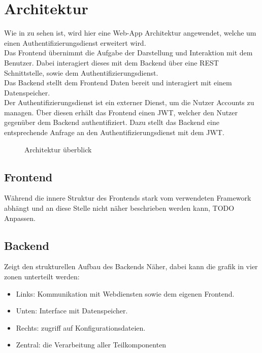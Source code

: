 \chapter{Architektur}\label{ch:architektur}

Wie in  zu sehen ist, wird hier eine Web-App Architektur angewendet,
welche um einen Authentifizierungsdienst erweitert wird.\\
Das Frontend übernimmt die Aufgabe der Darstellung und Interaktion mit dem Benutzer.
Dabei interagiert dieses mit dem Backend über eine \ac{REST} Schnittstelle, sowie dem Authentifizierungsdienst.\\
Das Backend stellt dem Frontend Daten bereit und interagiert mit einem Datenspeicher.\\
Der Authentifizierungsdienst ist ein externer Dienst, um die Nutzer Accounts zu managen.
Über diesen erhält das Frontend einen \ac{JWT}, welcher den Nutzer gegenüber dem Backend authentifiziert.
Dazu stellt das Backend eine entsprechende Anfrage an den Authentifizierungsdienst mit dem \ac{JWT}.

\begin{figure}[h]
    \centering
    
    \caption{Architektur überblick}\label{fig:HighLevelArch}
\end{figure}

\section{Frontend}

Während die innere Struktur des Frontends stark vom verwendeten Framework abhängt und an diese Stelle nicht näher beschrieben werden kann,
TODO Anpassen.

\section{Backend}\label{sec:fokus:-backend}

 Zeigt den strukturellen Aufbau des Backends Näher, dabei kann die grafik in vier zonen unterteilt werden:
\begin{itemize}
    \item Links: Kommunikation mit Webdiensten sowie dem eigenen Frontend.
    \item Unten: Interface mit Datenspeicher.
    \item Rechts: zugriff auf Konfigurationsdateien.
    \item Zentral: die Verarbeitung aller Teilkomponenten
\end{itemize}

